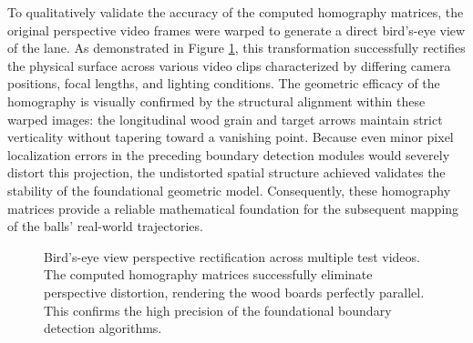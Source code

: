 To qualitatively validate the accuracy of the computed homography matrices, the original perspective video frames were warped to generate a direct bird's-eye view of the lane. As demonstrated in Figure \ref{fig:rectified_lanes}, this transformation successfully rectifies the physical surface across various video clips characterized by differing camera positions, focal lengths, and lighting conditions. The geometric efficacy of the homography is visually confirmed by the structural alignment within these warped images: the longitudinal wood grain and target arrows maintain strict verticality without tapering toward a vanishing point. Because even minor pixel localization errors in the preceding boundary detection modules would severely distort this projection, the undistorted spatial structure achieved validates the stability of the foundational geometric model. Consequently, these homography matrices provide a reliable mathematical foundation for the subsequent mapping of the balls' real-world trajectories.

\begin{figure}[htbp]
    \centering
    \caption{Bird's-eye view perspective rectification across multiple test videos. The computed homography matrices successfully eliminate perspective distortion, rendering the wood boards perfectly parallel. This confirms the high precision of the foundational boundary detection algorithms.}
    \label{fig:rectified_lanes}
\end{figure}





